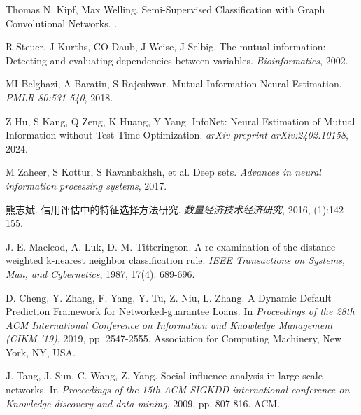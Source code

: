 \documentclass{article}
\begin{document}
\begin{thebibliography}{99}

Thomas N. Kipf, Max Welling.
\newblock Semi-Supervised Classification with Graph Convolutional Networks.
.

R Steuer, J Kurths, CO Daub, J Weise, J Selbig.
\newblock The mutual information: Detecting and evaluating dependencies between variables.
\newblock \emph{Bioinformatics}, 2002.

MI Belghazi, A Baratin, S Rajeshwar.
\newblock Mutual Information Neural Estimation.
\newblock \emph{PMLR 80:531-540}, 2018.

Z Hu, S Kang, Q Zeng, K Huang, Y Yang.
\newblock InfoNet: Neural Estimation of Mutual Information without Test-Time Optimization.
\newblock \emph{arXiv preprint arXiv:2402.10158}, 2024.

M Zaheer, S Kottur, S Ravanbakhsh, et al.
\newblock Deep sets.
\newblock \emph{Advances in neural information processing systems}, 2017.

熊志斌.
\newblock 信用评估中的特征选择方法研究.
\newblock \emph{数量经济技术经济研究}, 2016, (1):142-155.

J. E. Macleod, A. Luk, D. M. Titterington.
\newblock A re-examination of the distance-weighted k-nearest neighbor classification rule.
\newblock \emph{IEEE Transactions on Systems, Man, and Cybernetics}, 1987, 17(4): 689-696.

D. Cheng, Y. Zhang, F. Yang, Y. Tu, Z. Niu, L. Zhang.
\newblock A Dynamic Default Prediction Framework for Networked-guarantee Loans.
\newblock In \emph{Proceedings of the 28th ACM International Conference on Information and Knowledge Management (CIKM '19)}, 2019, pp. 2547-2555. Association for Computing Machinery, New York, NY, USA.

J. Tang, J. Sun, C. Wang, Z. Yang.
\newblock Social influence analysis in large-scale networks.
\newblock In \emph{Proceedings of the 15th ACM SIGKDD international conference on Knowledge discovery and data mining}, 2009, pp. 807-816. ACM.

\end{thebibliography}
\end{document}

